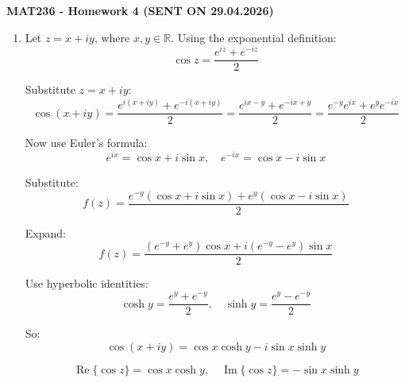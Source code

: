 \documentclass[11pt]{article}
\begin{document}
\begin{center}
\large
\textbf{MAT236 - Homework 4 (SENT ON 29.04.2026)}
\end{center}

\begin{enumerate}[leftmargin=*,label=\textbf{Q\arabic*.}]
\item Let $z = x + iy$, where $x, y \in \mathbb{R}$. Using the exponential definition:
\[\cos z = \frac{e^{iz} + e^{-iz}}{2}\]

Substitute $z = x + iy$:
\[\cos(x + iy) = \frac{e^{i(x+iy)} + e^{-i(x+iy)}}{2} = \frac{e^{ix - y} + e^{-ix + y}}{2}= \frac{e^{-y}e^{ix} + e^{y}e^{-ix}}{2}\]

Now use Euler’s formula:
\[e^{ix} = \cos x + i\sin x, \quad e^{-ix} = \cos x - i\sin x\]

Substitute:
\[f(z)= \frac{e^{-y}(\cos x + i\sin x) + e^{y}(\cos x - i\sin x)}{2}\]

Expand:
\[f(z)= \frac{(e^{-y} + e^{y})\cos x + i(e^{-y} - e^{y})\sin x}{2}\]

Use hyperbolic identities:
\[\cosh y = \frac{e^{y} + e^{-y}}{2}, \quad \sinh y = \frac{e^{y} - e^{-y}}{2}\]

So:
\[\cos(x + iy) = \cos x \cosh y - i \sin x \sinh y\]

\[\boxed{\operatorname{Re}\{\cos z\} = \cos x \cosh y, \quad
\operatorname{Im}\{\cos z\} = -\sin x \sinh y}\]

\end{enumerate}
\end{document}
